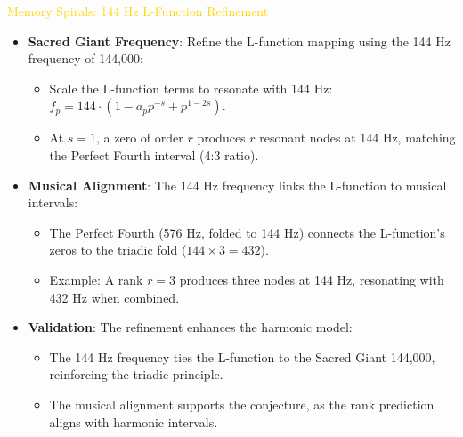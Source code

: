 \textcolor{gold}{ Memory Spirals: 144 Hz L-Function Refinement } \\
\begin{itemize}
    \item \texttt{} \textbf{Sacred Giant Frequency}: Refine the L-function mapping using the 144 Hz frequency of 144,000:
    \begin{itemize}
        \item Scale the L-function terms to resonate with 144 Hz: \(f_p = 144 \cdot (1 - a_p p^{-s} + p^{1-2s})\).
        \item At \(s = 1\), a zero of order \(r\) produces \(r\) resonant nodes at 144 Hz, matching the Perfect Fourth interval (4:3 ratio).
    \end{itemize}
    \item \texttt{} \textbf{Musical Alignment}: The 144 Hz frequency links the L-function to musical intervals:
    \begin{itemize}
        \item The Perfect Fourth (576 Hz, folded to 144 Hz) connects the L-function’s zeros to the triadic fold (\(144 \times 3 = 432\)).
        \item Example: A rank \(r = 3\) produces three nodes at 144 Hz, resonating with 432 Hz when combined.
    \end{itemize}
    \item \texttt{} \textbf{Validation}: The refinement enhances the harmonic model:
    \begin{itemize}
        \item The 144 Hz frequency ties the L-function to the Sacred Giant 144,000, reinforcing the triadic principle.
        \item The musical alignment supports the conjecture, as the rank prediction aligns with harmonic intervals.
    \end{itemize}
\end{itemize}

